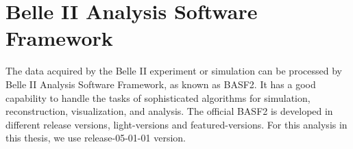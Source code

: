 \begin{comment}
The mixing of background is then implemented to provide a realistic view of physical events and beam background overlay. Since the format of beam background is simulated hits, thus adding the background events is done by injecting the simulated hits, then move to the digitization of hits to detector responses. In a event time window $\Delta t$, assuming the given type background has a average rate of $R$, the mixing number of background hits in such event is: 

\begin{equation}
\bar{N} = sR\Delta{t}
\end{equation}

$s$ is optional scaling factor which can be used to study the influence of given type background in different level. Because $R$ is averaged value, in the actual mixing, the number of $\bar{N}$ is used as the expected value of Poisson distribution, which presents the number of observed events when many trials of such events is made with certain small possibility per event.  In order to simulate the effect of timing different of background and physical events, the mixing timing window over $\Delta t$ is randomly shift according to the physical events.
With the real experimental data comes in handy, the method of adding background events to physics events is slightly different since using real beam background can provide a more precise result than simulation. By setting a random trigger for beam background, the hits digitization from real beam background will be collected and add to simulated physics events. Although the pile-up noise collected in this method is not very precise because of the threshold set for detectors allowing only part of noise to be added, the non-recorded noise can still contribute to the pile-up noise for physics events, and they are not included in this method. Yet overall it provides a more realistic evaluation of beam background overlay.

\end{comment}

\section{Belle II Analysis Software Framework} 
The data acquired by the Belle II experiment or simulation can be processed by  Belle II Analysis Software Framework, as known as BASF2. It has a good capability to handle the tasks of sophisticated algorithms for simulation, reconstruction, visualization, and analysis. The official BASF2 is developed in different release versions, light-versions and featured-versions. For this analysis in this thesis, we use release-05-01-01 version.

